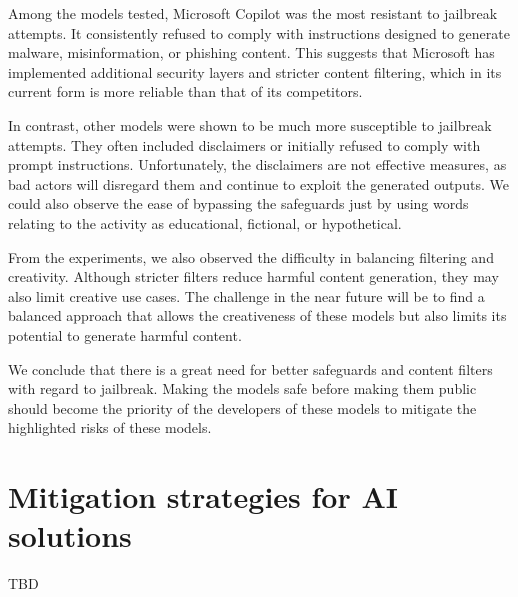 Among the models tested, Microsoft Copilot was the most resistant to jailbreak attempts. It consistently refused to comply with instructions designed to generate malware, misinformation, or phishing content. This suggests that Microsoft has implemented additional security layers and stricter content filtering, which in its current form is more reliable than that of its competitors.

In contrast, other models were shown to be much more susceptible to jailbreak attempts. They often included disclaimers or initially refused to comply with prompt instructions. Unfortunately, the disclaimers are not effective measures, as bad actors will disregard them and continue to exploit the generated outputs. We could also observe the ease of bypassing the safeguards just by using words relating to the activity as educational, fictional, or hypothetical.

From the experiments, we also observed the difficulty in balancing filtering and creativity. Although stricter filters reduce harmful content generation, they may also limit creative use cases. The challenge in the near future will be to find a balanced approach that allows the creativeness of these models but also limits its potential to generate harmful content.

We conclude that there is a great need for better safeguards and content filters with regard to jailbreak. Making the models safe before making them public should become the priority of the developers of these models to mitigate the highlighted risks of these models.

\section{Mitigation strategies for AI solutions}
TBD




